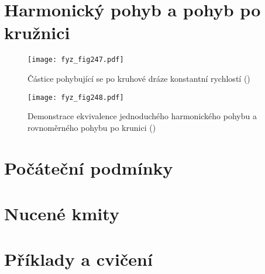   \section{Harmonický pohyb a pohyb po kružnici}\label{fyz:IchapXXIsecIII}
    \begin{figure}[ht!] %
      \centering
      \texttt{[image: fyz\_fig247.pdf]}
      \caption{Částice pohybující se po kruhové dráze konstantní rychlostí
              (\cite[s.~290]{Feynman01})}
      \label{fyz:fig247}
    \end{figure}

    \begin{figure}[ht!] %
      \centering
      \texttt{[image: fyz\_fig248.pdf]}
      \caption{Demonstrace ekvivalence jednoduchého harmonického pohybu a rovnoměrného pohybu po 
              krunici
              (\cite[s.~290]{Feynman01})}
      \label{fyz:fig248}
    \end{figure}

  \section{Počáteční podmínky}\label{fyz:IchapXXIsecIV}
  \section{Nucené kmity}\label{fyz:IchapXXIsecV}
  \section{Příklady a cvičení}\label{fyz:IchapXXIsecVI}




